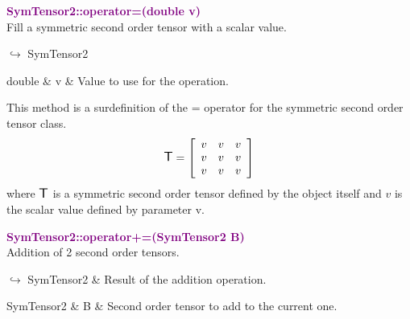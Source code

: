 \textcolor{purple}{\textbf{SymTensor2::operator=(double v)}}\label{SymTensor2::operator=(double v)}\\
Fill a symmetric second order tensor with a scalar value.\vspace*{-0.5em}
\begin{tcolorbox}[grow to left by=-1cm, width=\textwidth-1cm,myArgs,tabularx={l|R}]
$\hookrightarrow$ SymTensor2
\end{tcolorbox}

\begin{tcolorbox}[width=\textwidth,myArgs,tabularx={ll|R}]
double & v & Value to use for the operation.
\end{tcolorbox}

This method is a surdefinition of the = operator for the symmetric second order tensor class.
\begin{equation*}
\mbox{\large\ensuremath{\mathsf{T}}}=\left[\begin{array}{ccc}
v & v & v\\
v & v & v\\
v & v & v
\end{array}\right]
\end{equation*}
where $\mbox{\large\ensuremath{\mathsf{T}}}$ is a symmetric second order tensor defined by the object itself and $v$ is the scalar value defined by parameter v.

\textcolor{purple}{\textbf{SymTensor2::operator+=(SymTensor2 B)}}\label{SymTensor2::operator+=(SymTensor2 B)}\\
Addition of 2 second order tensors.\vspace*{-0.5em}
\begin{tcolorbox}[grow to left by=-1cm, width=\textwidth-1cm,myArgs,tabularx={l|R}]
$\hookrightarrow$ SymTensor2 & Result of the addition operation.
\end{tcolorbox}

\begin{tcolorbox}[width=\textwidth,myArgs,tabularx={ll|R}]
SymTensor2 & B & Second order tensor to add to the current one.
\end{tcolorbox}

